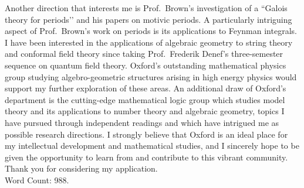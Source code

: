\documentclass[11pt]{article}
\begin{document}
\par 
Another direction that interests me is Prof.\ Brown’s investigation of a ``Galois theory for periods’’ and his papers on motivic periods. A particularly intriguing aspect of Prof.\ Brown’s work on periods is its applications to Feynman integrals. I have been interested in the applications of algebraic geometry to string theory and conformal field theory since taking Prof.\ Frederik Denef’s three-semester sequence on quantum field theory. Oxford's outstanding mathematical physics group studying algebro-geometric structures arising in high energy physics would support my further exploration of these areas. An additional draw of Oxford’s department is the cutting-edge mathematical logic group which studies model theory and its applications to number theory and algebraic geometry, topics I have pursued through independent readings and which have intrigued me as possible research directions. I strongly believe that Oxford is an ideal place for my intellectual development and mathematical studies, and I sincerely hope to be given the opportunity to learn from and contribute to this vibrant community. Thank you for considering my application.
\bigskip\\
Word Count: 988.
\end{document}
